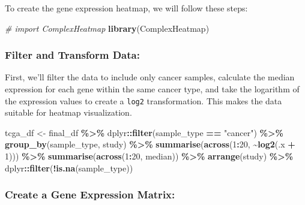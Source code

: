 \documentclass[
]{book}
\newenvironment{Shaded}{\begin{snugshade}}{\end{snugshade}}
\newcommand{\CommentTok}[1]{\textcolor[rgb]{0.56,0.35,0.01}{\textit{#1}}}
\newcommand{\DecValTok}[1]{\textcolor[rgb]{0.00,0.00,0.81}{#1}}
\newcommand{\FunctionTok}[1]{\textcolor[rgb]{0.13,0.29,0.53}{\textbf{#1}}}
\newcommand{\NormalTok}[1]{#1}
\newcommand{\OtherTok}[1]{\textcolor[rgb]{0.56,0.35,0.01}{#1}}
\newcommand{\SpecialCharTok}[1]{\textcolor[rgb]{0.81,0.36,0.00}{\textbf{#1}}}
\newcommand{\StringTok}[1]{\textcolor[rgb]{0.31,0.60,0.02}{#1}}
\begin{document}
To create the gene expression heatmap, we will follow these steps:

\begin{Shaded}
\begin{Highlighting}[]
\CommentTok{\# import ComplexHeatmap}
\FunctionTok{library}\NormalTok{(ComplexHeatmap)}
\end{Highlighting}
\end{Shaded}

\hypertarget{filter-and-transform-data}{%
\subsubsection{Filter and Transform Data:}\label{filter-and-transform-data}}

First, we'll filter the data to include only cancer samples, calculate the median expression for each gene within the same cancer type, and take the logarithm of the expression values to create a \texttt{log2} transformation. This makes the data suitable for heatmap visualization.

\begin{Shaded}
\begin{Highlighting}[]
\NormalTok{tcga\_df }\OtherTok{\textless{}{-}}\NormalTok{ final\_df }\SpecialCharTok{\%\textgreater{}\%}
\NormalTok{  dplyr}\SpecialCharTok{::}\FunctionTok{filter}\NormalTok{(sample\_type }\SpecialCharTok{==} \StringTok{"cancer"}\NormalTok{) }\SpecialCharTok{\%\textgreater{}\%}
  \FunctionTok{group\_by}\NormalTok{(sample\_type, study) }\SpecialCharTok{\%\textgreater{}\%}
  \FunctionTok{summarise}\NormalTok{(}\FunctionTok{across}\NormalTok{(}\DecValTok{1}\SpecialCharTok{:}\DecValTok{20}\NormalTok{, }\SpecialCharTok{\textasciitilde{}}\FunctionTok{log2}\NormalTok{(.x }\SpecialCharTok{+} \DecValTok{1}\NormalTok{))) }\SpecialCharTok{\%\textgreater{}\%}
  \FunctionTok{summarise}\NormalTok{(}\FunctionTok{across}\NormalTok{(}\DecValTok{1}\SpecialCharTok{:}\DecValTok{20}\NormalTok{, median)) }\SpecialCharTok{\%\textgreater{}\%}
  \FunctionTok{arrange}\NormalTok{(study) }\SpecialCharTok{\%\textgreater{}\%}
\NormalTok{  dplyr}\SpecialCharTok{::}\FunctionTok{filter}\NormalTok{(}\SpecialCharTok{!}\FunctionTok{is.na}\NormalTok{(sample\_type))}
\end{Highlighting}
\end{Shaded}

\hypertarget{create-a-gene-expression-matrix}{%
\subsubsection{Create a Gene Expression Matrix:}\label{create-a-gene-expression-matrix}}
\end{document}

